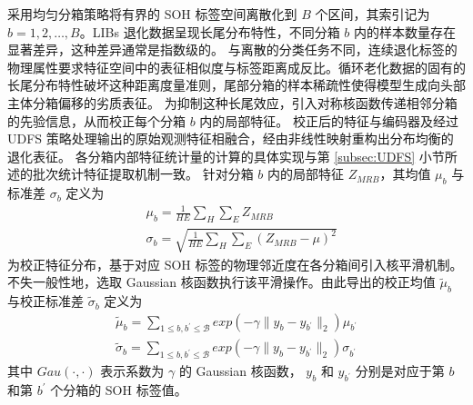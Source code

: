 采用均匀分箱策略将有界的 SOH 标签空间离散化到 $B$ 个区间，其索引记为 $b=1,2,\dots,B$。LIBs 退化数据呈现长尾分布特性，不同分箱 $b$ 内的样本数量存在显著差异，这种差异通常是指数级的。
% 
与离散的分类任务不同，连续退化标签的物理属性要求特征空间中的表征相似度与标签距离成反比。循环老化数据的固有的长尾分布特性破坏这种距离度量准则，尾部分箱的样本稀疏性使得模型生成向头部主体分箱偏移的劣质表征。
% 
为抑制这种长尾效应，引入对称核函数传递相邻分箱的先验信息，从而校正每个分箱 $b$ 内的局部特征。
% 
校正后的特征与编码器及经过 UDFS 策略处理输出的原始观测特征相融合，经由非线性映射重构出分布均衡的退化表征。
各分箱内部特征统计量的计算的具体实现与第 \ref{subsec:UDFS} 小节所述的批次统计特征提取机制一致。
针对分箱 $b$ 内的局部特征 $Z_{MRB}$，其均值 $\mu_{b}$ 与标准差 $\sigma_{b}$ 定义为
% 
\begin{align}
    & \mu_{\textit{b}} = \frac{1}{HE}\sum_{H}\sum_{E}Z_{MRB} \\
    & \sigma_{\textit{b}} = \sqrt{\frac{1}{HE}\sum_{H}\sum_{E}(Z_{MRB} - \mu)^{2}}
\end{align}
% 
为校正特征分布，基于对应 SOH 标签的物理邻近度在各分箱间引入核平滑机制。不失一般性地，选取 Gaussian 核函数执行该平滑操作。由此导出的校正均值 $\tilde{\mu}_b$ 与校正标准差 $\tilde{\sigma}_b$ 定义为
\begin{align}
    \widetilde{\mu}_{\textit{b}} = \sum_{1 \leq \textit{b}, \textit{b}^{\prime} \leq \mathcal{B}}exp(-\gamma\|y_{\textit{b}} - y_{\textit{b}^{\prime}}\|_{2})\mu_{\textit{b}^{\prime}} \label{mu_calibration} \\
    \widetilde{\sigma}_{\textit{b}} = \sum_{1 \leq \textit{b}, \textit{b}^{\prime} \leq \mathcal{B}}exp(-\gamma\|y_{\textit{b}} - y_{\textit{b}^{\prime}}\|_{2})\sigma_{\textit{b}^{\prime}} \label{sigma_calibration}
\end{align}
其中 $Gau(\cdot, \cdot)$ 表示系数为 $\gamma$ 的 Gaussian 核函数， $y_{\textit{b}}$ 和 $y_{\textit{b}^{\prime}}$ 分别是对应于第 $\textit{b}$ 和第 $\textit{b}^{\prime}$ 个分箱的 SOH 标签值。


